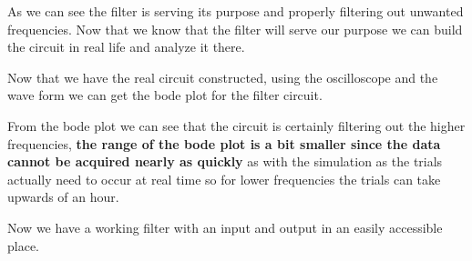 \documentclass{article}
\begin{document}
As we can see the filter is serving its purpose and properly filtering out unwanted frequencies. Now that we know that the filter will serve our purpose we can build the circuit in real life and analyze it there.
\begin{center}
\end{center}
Now that we have the real circuit constructed, using the oscilloscope and the wave form we can get the bode plot for the filter circuit.

From the bode plot we can see that the circuit is certainly filtering out the higher frequencies, \textbf{the range of the bode plot is a bit smaller since the data cannot be acquired nearly as quickly} as with the simulation as the trials actually need to occur at real time so for lower frequencies the trials can take upwards of an hour.
\begin{center}
\end{center}
Now we have a working filter with an input and output in an easily accessible place.
\end{document}
